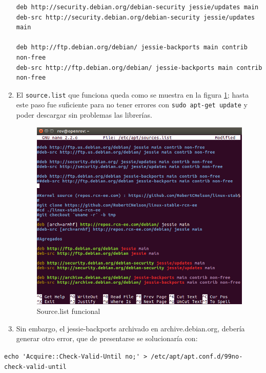 \begin{enumerate}
\begin{verbatim}
deb http://security.debian.org/debian-security jessie/updates main
deb-src http://security.debian.org/debian-security jessie/updates main

deb http://ftp.debian.org/debian/ jessie-backports main contrib non-free
deb-src http://ftp.debian.org/debian/ jessie-backports main contrib non-free

\end{verbatim}


\normalsize
    \item El \verb|source.list| que funciona queda como se muestra en la figura \ref{fig:SourceFunciona}; hasta este paso fue suficiente para no tener errores con \verb|sudo apt-get update| y poder descargar sin problemas las librerías.
    
    \begin{figure}[H]
        \centering
        \includegraphics[scale=0.5]{partes/ImgSophia/Apendice/3SourceListFuncional.png}
        \caption{Source.list funcional}
        \label{fig:SourceFunciona}
    \end{figure}
    
    \item Sin embargo, el jessie-backports archivado en  archive.debian.org, debería generar otro error, que de presentarse se solucionaría con:
\end{enumerate}
    \footnotesize
    \verb|echo 'Acquire::Check-Valid-Until no;' > /etc/apt/apt.conf.d/99no-check-valid-until|
\normalsize



